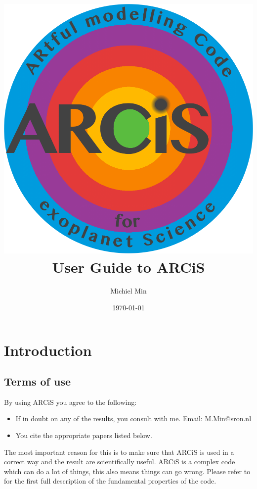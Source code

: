 \documentclass[12pt]{article}
\begin{document}
\title{\includegraphics[width=0.9\hsize]{ARCiS}\\User Guide to ARCiS}
\author{Michiel Min}
\date{\today}
\maketitle

\section{Introduction}


\subsection{Terms of use}

By using ARCiS you agree to the following:
\begin{itemize}
\item If in doubt on any of the results, you consult with me. Email: M.Min@sron.nl
\item You cite the appropriate papers listed below.
\end{itemize}
The most important reason for this is to make sure that ARCiS is used in a correct way and the result are scientifically useful. ARCiS is a complex code which can do a lot of things, this also means things can go wrong. Please refer to \cite{2020A&A...642A..28M} for the first full description of the fundamental properties of the code.
\end{document}
